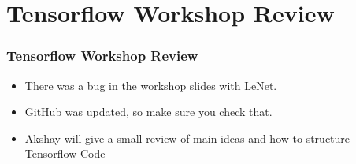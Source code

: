 \documentclass{beamer}
\begin{document}
\section{Tensorflow Workshop Review}
\begin{frame}
  \frametitle{Tensorflow Workshop Review}
  \begin{itemize}
  \item There was a bug in the workshop slides with LeNet.
  \item GitHub was updated, so make sure you check that.
  \item Akshay will give a small review of main ideas and how to structure Tensorflow Code
  \end{itemize}
\end{frame}


\end{document}
